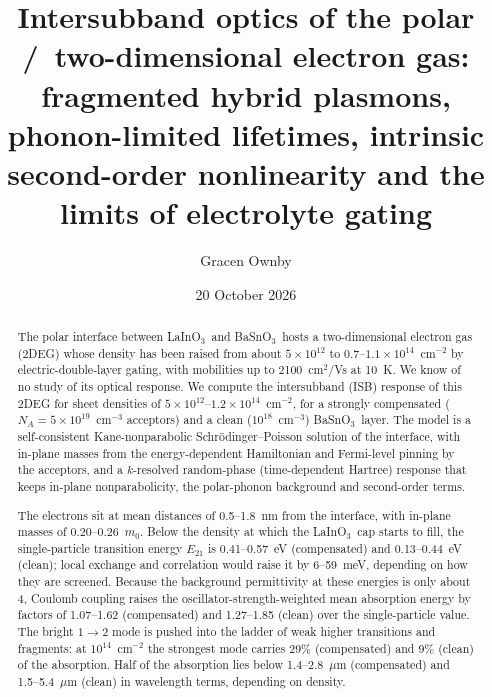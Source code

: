 \documentclass[11pt]{article}
\title{Intersubband optics of the polar \LIO/\BSO\ two-dimensional electron gas: fragmented hybrid plasmons, phonon-limited lifetimes, intrinsic second-order nonlinearity and the limits of electrolyte gating}
\author{Gracen Ownby}
\affil{University of Oklahoma, Norman, Oklahoma, USA}
\date{\small 20 October 2026}
\newcommand{\LIO}{\texorpdfstring{LaInO$_3$}{LaInO3}}
\newcommand{\BSO}{\texorpdfstring{BaSnO$_3$}{BaSnO3}}
\begin{document}
\maketitle

\begin{abstract}
The polar interface between \LIO\ and \BSO\ hosts a two-dimensional electron gas (2DEG) whose density has been raised from about $5\times10^{12}$ to $0.7$--$1.1\times10^{14}$~cm$^{-2}$ by electric-double-layer gating, with mobilities up to 2100~cm$^2$/Vs at 10~K. We know of no study of its optical response. We compute the intersubband (ISB) response of this 2DEG for sheet densities of $5\times10^{12}$--$1.2\times10^{14}$~cm$^{-2}$, for a strongly compensated ($N_A=5\times10^{19}$~cm$^{-3}$ acceptors) and a clean ($10^{18}$~cm$^{-3}$) \BSO\ layer. The model is a self-consistent Kane-nonparabolic Schr\"odinger--Poisson solution of the interface, with in-plane masses from the energy-dependent Hamiltonian and Fermi-level pinning by the acceptors, and a $k$-resolved random-phase (time-dependent Hartree) response that keeps in-plane nonparabolicity, the polar-phonon background and second-order terms.

The electrons sit at mean distances of 0.5--1.8~nm from the interface, with in-plane masses of 0.20--0.26~$m_0$. Below the density at which the \LIO\ cap starts to fill, the single-particle transition energy $E_{21}$ is 0.41--0.57~eV (compensated) and 0.13--0.44~eV (clean); local exchange and correlation would raise it by 6--59~meV, depending on how they are screened. Because the background permittivity at these energies is only about 4, Coulomb coupling raises the oscillator-strength-weighted mean absorption energy by factors of 1.07--1.62 (compensated) and 1.27--1.85 (clean) over the single-particle value. The bright $1\to2$ mode is pushed into the ladder of weak higher transitions and fragments: at $10^{14}$~cm$^{-2}$ the strongest mode carries 29\% (compensated) and 9\% (clean) of the absorption. Half of the absorption lies below 1.4--2.8~$\mu$m (compensated) and 1.5--5.4~$\mu$m (clean) in wavelength terms, depending on density.


\end{abstract}
\end{document}
